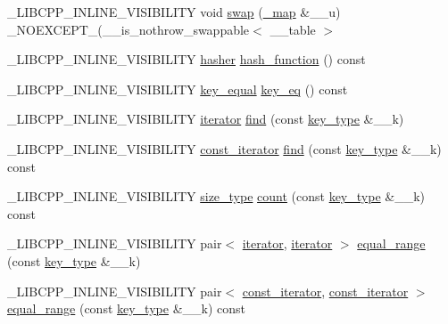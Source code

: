 \begin{DoxyCompactItemize}
\item 
\+\_\+\+L\+I\+B\+C\+P\+P\+\_\+\+I\+N\+L\+I\+N\+E\+\_\+\+V\+I\+S\+I\+B\+I\+L\+I\+T\+Y void \hyperlink{class__map_aa5ef7a2458f0482c1da50864b01bbd2b}{swap} (\hyperlink{class__map}{\+\_\+map} \&\+\_\+\+\_\+u) \+\_\+\+N\+O\+E\+X\+C\+E\+P\+T\+\_\+(\+\_\+\+\_\+is\+\_\+nothrow\+\_\+swappable$<$ \+\_\+\+\_\+table $>$
\item 
\+\_\+\+L\+I\+B\+C\+P\+P\+\_\+\+I\+N\+L\+I\+N\+E\+\_\+\+V\+I\+S\+I\+B\+I\+L\+I\+T\+Y \hyperlink{class__map_a1ca536646126d87b3ac0b7fe3aee3534}{hasher} \hyperlink{class__map_afd1bb623a604d453ce13fce5219a7c0d}{hash\+\_\+function} () const 
\item 
\+\_\+\+L\+I\+B\+C\+P\+P\+\_\+\+I\+N\+L\+I\+N\+E\+\_\+\+V\+I\+S\+I\+B\+I\+L\+I\+T\+Y \hyperlink{class__map_ac341e21272b7041e034855227f1cce49}{key\+\_\+equal} \hyperlink{class__map_a4198532cdf80b4d2f4521a908a4f4b6f}{key\+\_\+eq} () const 
\item 
\+\_\+\+L\+I\+B\+C\+P\+P\+\_\+\+I\+N\+L\+I\+N\+E\+\_\+\+V\+I\+S\+I\+B\+I\+L\+I\+T\+Y \hyperlink{class__map_a9ed817d33532f34fc46649b3fbe8e612}{iterator} \hyperlink{class__map_a4707982265a440345c3518e5407bdea8}{find} (const \hyperlink{class__map_a38e77c21e3aba60e817666c55ff61164}{key\+\_\+type} \&\+\_\+\+\_\+k)
\item 
\+\_\+\+L\+I\+B\+C\+P\+P\+\_\+\+I\+N\+L\+I\+N\+E\+\_\+\+V\+I\+S\+I\+B\+I\+L\+I\+T\+Y \hyperlink{class__map_ab0513968c2610ccf3b3fe070184396aa}{const\+\_\+iterator} \hyperlink{class__map_af96b80e57d41145d309ea91c37c9cc31}{find} (const \hyperlink{class__map_a38e77c21e3aba60e817666c55ff61164}{key\+\_\+type} \&\+\_\+\+\_\+k) const 
\item 
\+\_\+\+L\+I\+B\+C\+P\+P\+\_\+\+I\+N\+L\+I\+N\+E\+\_\+\+V\+I\+S\+I\+B\+I\+L\+I\+T\+Y \hyperlink{class__map_adc37f621be25fda072b12873e60e9fc7}{size\+\_\+type} \hyperlink{class__map_a362fb7db2c4bc21198144d3f24d480aa}{count} (const \hyperlink{class__map_a38e77c21e3aba60e817666c55ff61164}{key\+\_\+type} \&\+\_\+\+\_\+k) const 
\item 
\+\_\+\+L\+I\+B\+C\+P\+P\+\_\+\+I\+N\+L\+I\+N\+E\+\_\+\+V\+I\+S\+I\+B\+I\+L\+I\+T\+Y pair$<$ \hyperlink{class__map_a9ed817d33532f34fc46649b3fbe8e612}{iterator}, \hyperlink{class__map_a9ed817d33532f34fc46649b3fbe8e612}{iterator} $>$ \hyperlink{class__map_a664d04495c2dfc405a42183f527ddf3f}{equal\+\_\+range} (const \hyperlink{class__map_a38e77c21e3aba60e817666c55ff61164}{key\+\_\+type} \&\+\_\+\+\_\+k)
\item 
\+\_\+\+L\+I\+B\+C\+P\+P\+\_\+\+I\+N\+L\+I\+N\+E\+\_\+\+V\+I\+S\+I\+B\+I\+L\+I\+T\+Y pair$<$ \hyperlink{class__map_ab0513968c2610ccf3b3fe070184396aa}{const\+\_\+iterator}, \hyperlink{class__map_ab0513968c2610ccf3b3fe070184396aa}{const\+\_\+iterator} $>$ \hyperlink{class__map_a52e09820e2b6c80802e826657aed8ac5}{equal\+\_\+range} (const \hyperlink{class__map_a38e77c21e3aba60e817666c55ff61164}{key\+\_\+type} \&\+\_\+\+\_\+k) const 

\end{DoxyCompactItemize}
